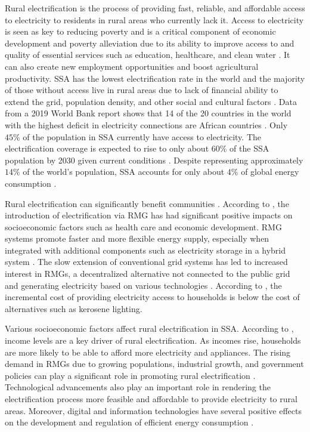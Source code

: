 Rural electrification is the process of providing fast, reliable, and affordable access to electricity to residents in rural areas who currently lack it. Access to electricity is seen as key to reducing poverty and is a critical component of economic development and poverty alleviation due to its ability to improve access to and quality of essential services such as education, healthcare, and clean water \cite{hussein2012analysis, hanjra2009reducing}. It can also create new employment opportunities and boost agricultural productivity. SSA has the lowest electrification rate in the world and the majority of those without access live in rural areas due to lack of financial ability to extend the grid, population density, and other social and cultural factors \cite{zebra2021review}. Data from a 2019 World Bank report shows that 14 of the 20 countries in the world with the highest deficit in electricity connections are African countries \cite{Tracking_SDG7_Report_2019}. Only $45\%$ of the population in SSA currently have access to electricity. The electrification coverage is expected to rise to only about $60\%$ of the SSA population by 2030 given current conditions \cite{valickova2021costs}. Despite representing approximately $14\%$ of the world's population, SSA accounts for only about $4\%$ of global energy consumption \cite{falk2021socio}.

Rural electrification can significantly benefit communities \cite{chakravorty2016lighting}. According to \cite{falk2021socio}, the introduction of electrification via RMG has had significant positive impacts on socioeconomic factors such as health care and economic development. RMG systems promote faster and more flexible energy supply, especially when integrated with additional components such as electricity storage in a hybrid system \cite{mazzeo2021literature}. The slow extension of conventional grid systems has led to increased interest in RMGs, a decentralized alternative not connected to the public grid and generating electricity based on various technologies \cite{korkovelos2020retrospective}. According to \cite{valickova2021costs}, the incremental cost of providing electricity access to households is below the cost of alternatives such as kerosene lighting.

Various socioeconomic factors affect rural electrification in SSA. According to \cite{poblete2021model}, income levels are a key driver of rural electrification. As incomes rise, households are more likely to be able to afford more electricity and appliances. The rising demand in RMGs due to growing populations, industrial growth, and government policies can play a significant role in promoting rural electrification \cite{antonanzas2021state}. Technological advancements also play an important role in rendering the electrification process more feasible and affordable to provide electricity to rural areas. Moreover, digital and information technologies have several positive effects on the development and regulation of efficient energy consumption \cite{shabalov2021influence, Consultant_Klooss_Consultant_2021}.

